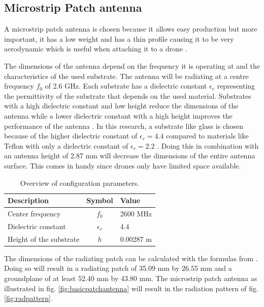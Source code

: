 \documentclass[twocolumn]{phdsymp} %
\begin{document}
\subsection{Microstrip Patch antenna}
A microstrip patch antenna is chosen because it allows easy production but more important, it has a low weight 
and has a thin profile causing it to be very aerodynamic which is useful when attaching it to a drone \cite{J13_microstripadvantages}.

The dimensions of the antenna depend on the frequency it is operating at and the characteristics of the used substrate.
The antenna will be radiating at a centre frequency $f_0$ of 2.6 GHz. Each substrate has a dielectric constant $\epsilon_r$ representing 
the permittivity of the substrate that depends on the used material.
Substrates with a high dielectric constant and low height 
reduce the dimensions of the antenna
while a lower dielectric constant with a high height improves the performance of the antenna \cite{J14_antennadesign,J15_antennadesign}. 
In this research, a substrate like glass 
is chosen because of the higher dielectric constant of $\epsilon_r = 4.4$ compared to materials like Teflon with only a dielectric 
constant of $\epsilon_r = 2.2$ \cite{J14_antennadesign}. 
Doing this in combination with an antenna height of 2.87 mm will decrease the dimensions of the entire antenna surface.
This comes in handy since drones only have limited space available.
\newline
\newline
\begin{table}[h!]
\centering
\begin{tabular}{|l|c|l|}
\hline
 Description            & Symbol          & Value         \\    \hline
 Center frequency       & $f_0$           & 2600 MHz       \\ 
 Dielectric constant    & $\epsilon_r$    & 4.4         \\ 
 Height of the substrate & $h$             & 0.00287 m    \\ \hline
\end{tabular}
\caption{Overview of configuration parameters.}
\label{table:antennaparas}
\end{table}

The dimensions of the radiating patch can be calculated with the formulas from \cite{J14_antennadesign,J15_antennadesign}.
Doing so will result in a radiating patch of 35.09 mm by 26.55 mm and a groundplane of at least 52.40 mm by 43.80 mm.
The microstrip patch antenna as illustrated in fig. \ref{fig:basicpatchantenna} will result in the radiation pattern of fig. \ref{fig:radpattern}.
\end{document}
